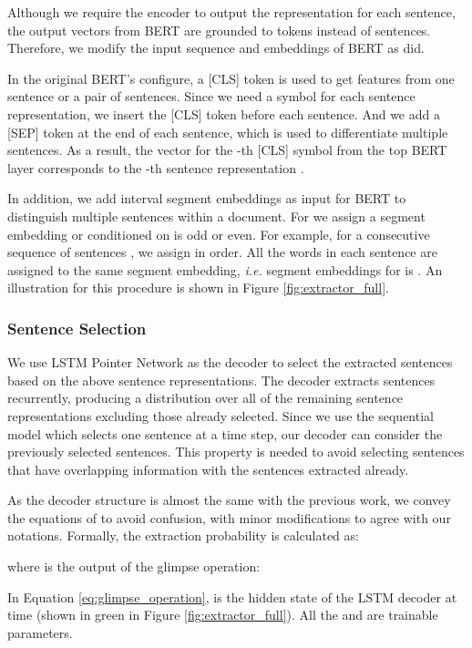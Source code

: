 \documentclass[11pt,a4paper]{article}
\begin{document}
Although we require the encoder
to output the representation for each sentence,
the output vectors from BERT are grounded to tokens
instead of sentences. Therefore, we modify the input
sequence and embeddings of BERT as \citet{liu2019fine} did.

In the original BERT's configure, a [CLS] token is used
to get features from one sentence or a pair of sentences.
Since we need a symbol for each sentence representation,
we insert the [CLS] token before each sentence. And we
add a [SEP] token at the end of each sentence, which is used to
differentiate multiple sentences. As a result, the vector for the -th 
[CLS] symbol from the top BERT layer corresponds to the -th sentence representation .

In addition, we add interval segment embeddings as input for BERT
to distinguish multiple
sentences within a document. For  we assign
a segment embedding  or  conditioned on 
is odd or even. For example, for a consecutive sequence of sentences , 
we assign  in order.
All the words in each sentence are assigned to the same
segment embedding, \emph{i.e.} segment embeddings for
 is .
An illustration for this procedure is shown in Figure \ref{fig:extractor_full}.

\subsubsection{Sentence Selection}

We use LSTM Pointer Network \cite{vinyals2015pointer}
as the decoder to select the extracted sentences
based on the above sentence representations. The decoder
extracts sentences recurrently, producing a distribution
over all of the remaining sentence representations
excluding those already selected.
Since we use the sequential model which selects
one sentence at a time step, our decoder
can consider the previously selected sentences.
This property is needed to avoid selecting sentences
that have overlapping information
with the sentences extracted already.

As the decoder structure is almost the same with the previous work,
we convey the equations of \citet{chen-bansal-2018-fast}
to avoid confusion, with minor modifications to agree with our notations.
Formally, the extraction probability is calculated as:

where  is the output of the glimpse operation:

In Equation \ref{eq:glimpse_operation},  is the hidden state
of the LSTM decoder at time  (shown in green in Figure \ref{fig:extractor_full}).
All the  and  are trainable parameters.
\end{document}
